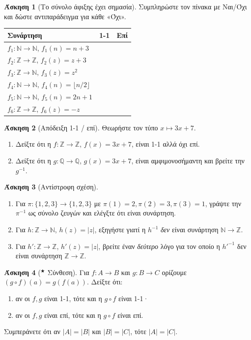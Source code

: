 \documentclass[11pt,a4paper]{article}
\theoremstyle{definition}
\newtheorem{question}{Άσκηση}
\newcommand{\N}{\mathbb{N}}
\newcommand{\Z}{\mathbb{Z}}
\newcommand{\Q}{\mathbb{Q}}
\newcommand{\st}{$^{\bigstar}$}  %
\newcommand{\gi}[1]{\item[(#1)]}
\begin{document}
\begin{question}[Το σύνολο άφιξης έχει σημασία]
Συμπληρώστε τον πίνακα με Ναι/Όχι και δώστε αντιπαράδειγμα για κάθε «Όχι».
\begin{center}
\begin{tabular}{lcc}
\toprule
Συνάρτηση & 1-1 & Επί\\
\midrule
$f_1:\N\to\N$, $f_1(n)=n+3$ & & \\
$f_2:\Z\to\Z$, $f_2(z)=z+3$ & & \\
$f_3:\Z\to\N$, $f_3(z)=z^2$ & & \\
$f_4:\N\to\N$, $f_4(n)=\lfloor n/2\rfloor$ & & \\
$f_5:\N\to\N$, $f_5(n)=2n+1$ & & \\
$f_6:\Z\to\Z$, $f_6(z)=-z$ & & \\
\bottomrule
\end{tabular}
\end{center}
\end{question}


\begin{question}[Απόδειξη 1-1 / επί]
Θεωρήστε τον τύπο $x\mapsto 3x+7$.
\begin{enumerate}[itemsep=0pt]
\gi{α} Δείξτε ότι η $f:\Z\to\Z$, $f(x)=3x+7$, είναι 1-1 αλλά όχι επί.
\gi{β} Δείξτε ότι η $g:\Q\to\Q$, $g(x)=3x+7$, είναι αμφιμονοσήμαντη και βρείτε την $g^{-1}$.
\end{enumerate}
\end{question}


\begin{question}[Αντίστροφη σχέση]
\begin{enumerate}[itemsep=0pt]
\gi{α} Για $\pi:\{1,2,3\}\to\{1,2,3\}$ με $\pi(1)=2,\pi(2)=3,\pi(3)=1$, γράψτε την $\pi^{-1}$
ως σύνολο ζευγών και ελέγξτε ότι είναι συνάρτηση.
\gi{β} Για $h:\Z\to\N$, $h(z)=|z|$, εξηγήστε γιατί η $h^{-1}$ \emph{δεν} είναι συνάρτηση
$\N\to\Z$.
\gi{γ} Για $h':\Z\to\Z$, $h'(z)=|z|$, βρείτε έναν \emph{δεύτερο} λόγο για τον οποίο η
$h'^{-1}$ δεν είναι συνάρτηση $\Z\to\Z$.
\end{enumerate}
\end{question}


\begin{question}[\st{} Σύνθεση]
Για $f:A\to B$ και $g:B\to C$ ορίζουμε $(g\circ f)(a)=g(f(a))$. Δείξτε ότι:
\begin{enumerate}[itemsep=0pt]
\gi{α} αν οι $f,g$ είναι 1-1, τότε και η $g\circ f$ είναι 1-1·
\gi{β} αν οι $f,g$ είναι επί, τότε και η $g\circ f$ είναι επί.
\end{enumerate}
Συμπεράνετε ότι αν $|A|=|B|$ και $|B|=|C|$, τότε $|A|=|C|$.
\end{question}
\end{document}
